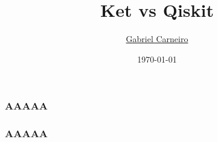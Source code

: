 \documentclass[12pt]{beamer}
\title{Ket vs Qiskit}
\author{\href{https://github.com/G-Carneiro}{Gabriel Carneiro}}
\institute[UFSC]{Universidade Federal de Santa Catarina}
\date{\today}
\begin{document}
    \begin{frame}[plain]
        \titlepage
    \end{frame}

    \begin{frame}
        \frametitle{AAAAA}
    \end{frame}
    \begin{frame}
        \frametitle{AAAAA}
    \end{frame}
\end{document}
